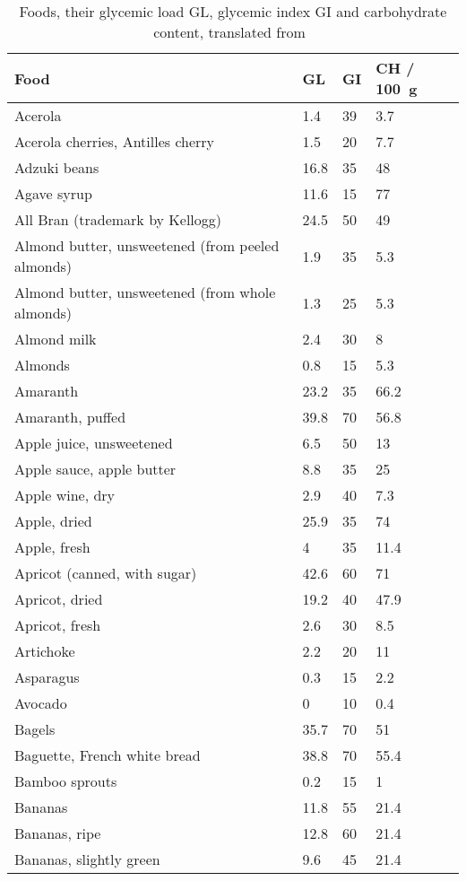 \documentclass[../main.tex]{subfiles}
\begin{document}
\clearpage
\thispagestyle{empty}
  \centering
  \begin{longtable}{llll}
    \caption{Foods, their glycemic load GL, glycemic index GI and carbohydrate content, translated from~\cite{wittekind}}\\
    \toprule
    \textbf{Food} & \textbf{GL} & \textbf{GI} & \textbf{CH / \SI{100}{\gram}}\\
    \midrule
    \endhead
Acerola & 1.4 & 39 & 3.7 \\
Acerola cherries, Antilles cherry & 1.5 & 20 & 7.7 \\
Adzuki beans & 16.8 & 35 & 48 \\
Agave syrup & 11.6 & 15 & 77 \\
All Bran (trademark by Kellogg) & 24.5 & 50 & 49 \\
Almond butter, unsweetened (from peeled almonds) & 1.9 & 35 & 5.3 \\
Almond butter, unsweetened (from whole almonds) & 1.3 & 25 & 5.3 \\
Almond milk & 2.4 & 30 & 8 \\
Almonds & 0.8 & 15 & 5.3 \\
Amaranth & 23.2 & 35 & 66.2 \\
Amaranth, puffed & 39.8 & 70 & 56.8 \\
Apple juice, unsweetened & 6.5 & 50 & 13 \\
Apple sauce, apple butter & 8.8 & 35 & 25 \\
Apple wine, dry & 2.9 & 40 & 7.3 \\
Apple, dried & 25.9 & 35 & 74 \\
Apple, fresh & 4 & 35 & 11.4 \\
Apricot (canned, with sugar) & 42.6 & 60 & 71 \\
Apricot, dried & 19.2 & 40 & 47.9 \\
Apricot, fresh & 2.6 & 30 & 8.5 \\
Artichoke & 2.2 & 20 & 11 \\
Asparagus & 0.3 & 15 & 2.2 \\
Avocado & 0 & 10 & 0.4 \\
Bagels & 35.7 & 70 & 51 \\
Baguette, French white bread & 38.8 & 70 & 55.4 \\
Bamboo sprouts & 0.2 & 15 & 1 \\
Bananas & 11.8 & 55 & 21.4 \\
Bananas, ripe & 12.8 & 60 & 21.4 \\
Bananas, slightly green & 9.6 & 45 & 21.4 \\

\end{longtable}
\end{document}

